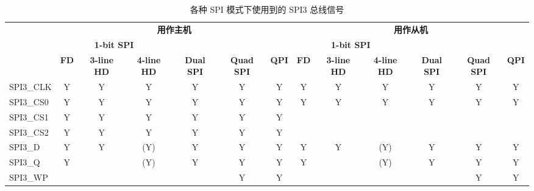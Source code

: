 \documentclass[main\_\_CN.tex]{subfiles}
\begin{document}
\begin{landscape}
 
\begin{table}[H]
    \centering
    \caption{各种 SPI 模式下使用到的 SPI3 总线信号}
    \label{tab:spi3-bus-singals-used-in-various-spi-modes}

    \begin{threeparttable}
    \begin{tabular}{ |p{2.0cm} |c|c|c|c|c|c|c|c|c|c|c|c| }
    \hline
        \rowcolor{lightgray}
        & \multicolumn{6}{c|}{\textbf{用作主机}} & \multicolumn{6}{c|}{\textbf{用作从机}} \\\cline{2-13}
        \rowcolor{lightgray}
        & \multicolumn{3}{c|}{\textbf{1-bit SPI}} & & & & \multicolumn{3}{c|}{\textbf{1-bit SPI}} & & & \\ \cline{2-4} \cline{8-10}
        \rowcolor{lightgray}
        \multirow{-3}{*}{\textbf{SPI3 总线信号}} & \textbf{FD\tnote{1}} & \textbf{3-line HD\tnote{2}} & \textbf{4-line HD} & \multirow{-2}{*}{\textbf{Dual SPI}} & \multirow{-2}{*}{\textbf{Quad SPI}} & \multirow{-2}{*}{\textbf{QPI}} & \textbf{FD} & \textbf{3-line HD} & \textbf{4-line HD} & \multirow{-2}{*}{\textbf{Dual SPI}} & \multirow{-2}{*}{\textbf{Quad SPI}} & \multirow{-2}{*}{\textbf{QPI}} \\ \hline
SPI3\_CLK                  & Y       & Y       & Y       & Y       & Y       & Y      & Y       & Y      & Y       & Y       & Y       & Y      \\ \hline
SPI3\_CS0                  & Y       & Y       & Y       & Y       & Y       & Y      & Y       & Y      & Y       & Y       & Y       & Y      \\ \hline
SPI3\_CS1                  & Y       & Y       & Y       & Y       & Y       & Y      &         &        &         &         &         &        \\ \hline
SPI3\_CS2                  & Y       & Y       & Y       & Y       & Y       & Y      &         &        &         &         &         &        \\ \hline
SPI3\_D                    & Y       & Y       & (Y)\tnote{3}      & Y\tnote{4}      & Y\tnote{5}      & Y      & Y       & Y      & (Y)\tnote{6}      & Y\tnote{7}     & Y\tnote{8}     & Y      \\ \hline
SPI3\_Q                    & Y       &         & (Y)\tnote{3}      & Y\tnote{4}      & Y\tnote{5}      & Y      & Y       &        & (Y)\tnote{6}     & Y\tnote{7}     & Y\tnote{8}      & Y      \\ \hline
SPI3\_WP                   &         &         &         &         & Y\tnote{5}      & Y      &         &        &         &         & Y\tnote{8}       & Y      \\ \hline

\end{tabular}
\end{threeparttable}
\end{table}
\end{landscape}
\end{document}
